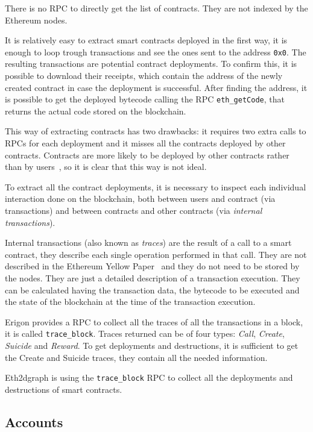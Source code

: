 There is no RPC to directly get the list of contracts. They are not indexed by the Ethereum nodes.

It is relatively easy to extract smart contracts deployed in the first way, it is enough to loop trough transactions and see the ones sent to the address \texttt{0x0}. The resulting transactions are potential contract deployments. To confirm this, it is possible to download their receipts, which contain the address of the newly created contract in case the deployment is successful. After finding the address, it is possible to get the deployed bytecode calling the RPC \texttt{eth\_getCode}, that returns the actual code stored on the blockchain.

This way of extracting contracts has two drawbacks: it requires two extra calls to RPCs for each deployment and it misses all the contracts deployed by other contracts. Contracts are more likely to be deployed by other contracts rather than by users~\cite{ethereum-sc-topology}, so it is clear that this way is not ideal.

To extract all the contract deployments, it is necessary to inspect each individual interaction done on the blockchain, both between users and contract (via transactions) and between contracts and other contracts (via \textit{internal transactions}). 

Internal transactions (also known as \textit{traces}) are the result of a call to a smart contract, they describe each single operation performed in that call. They are not described in the Ethereum Yellow Paper~\cite{ethereum-yellow} and they do not need to be stored by the nodes. They are just a detailed description of a transaction execution. They can be calculated having the transaction data, the bytecode to be executed and the state of the blockchain at the time of the transaction execution.

Erigon provides a RPC to collect all the traces of all the transactions in a block, it is called \texttt{trace\_block}. Traces returned can be of four types: \textit{Call}, \textit{Create}, \textit{Suicide} and \textit{Reward}. To get deployments and destructions, it is sufficient to get the Create and Suicide traces, they contain all the needed information.

Eth2dgraph is using the \texttt{trace\_block} RPC to collect all the deployments and destructions of smart contracts.

\subsection{Accounts}

